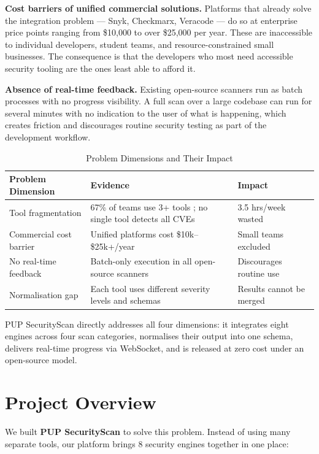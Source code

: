 \documentclass[12pt,a4paper]{report}
\begin{document}
\textbf{Cost barriers of unified commercial solutions.}
Platforms that already solve the integration problem --- Snyk, Checkmarx, Veracode --- do so at enterprise price points ranging from \$10,000 to over \$25,000 per year. These are inaccessible to individual developers, student teams, and resource-constrained small businesses. The consequence is that the developers who most need accessible security tooling are the ones least able to afford it.

\textbf{Absence of real-time feedback.}
Existing open-source scanners run as batch processes with no progress visibility. A full scan over a large codebase can run for several minutes with no indication to the user of what is happening, which creates friction and discourages routine security testing as part of the development workflow.

\begin{table}[H]
\centering
\caption{Problem Dimensions and Their Impact}
\label{tab:problem_summary}
\begin{tabular}{|p{4.5cm}|p{5.5cm}|p{3.5cm}|}
\hline
\textbf{Problem Dimension} & \textbf{Evidence} & \textbf{Impact} \\
\hline
Tool fragmentation & 67\% of teams use 3+ tools \cite{owasp2023}; no single tool detects all CVEs \cite{alfadel2023} & 3.5 hrs/week wasted \cite{gitlab2023} \\
\hline
Commercial cost barrier & Unified platforms cost \$10k--\$25k+/year & Small teams excluded \\
\hline
No real-time feedback & Batch-only execution in all open-source scanners & Discourages routine use \\
\hline
Normalisation gap & Each tool uses different severity levels and schemas & Results cannot be merged \\
\hline
\end{tabular}
\end{table}

PUP SecurityScan directly addresses all four dimensions: it integrates eight engines across four scan categories, normalises their output into one schema, delivers real-time progress via WebSocket, and is released at zero cost under an open-source model.

\section{Project Overview}

We built \textbf{PUP SecurityScan} to solve this problem. Instead of using many separate tools, our platform brings 8 security engines together in one place:
\end{document}
